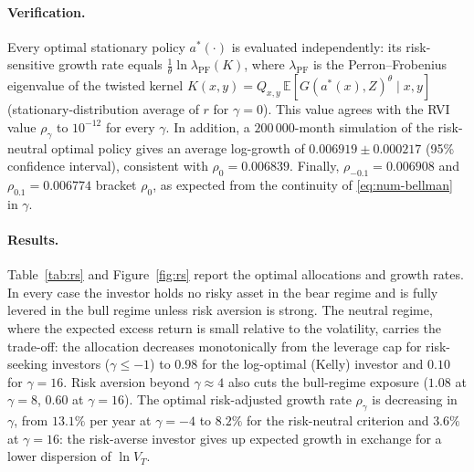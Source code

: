 \documentclass[11pt,a4paper]{article}
\newcommand{\E}{\mathbb{E}}
\begin{document}
\paragraph{Verification.} Every optimal stationary policy $a^*(\cdot)$ is evaluated independently: its risk-sensitive growth rate equals $\frac1\theta\ln\lambda_{\mathrm{PF}}(K)$, where $\lambda_{\mathrm{PF}}$ is the Perron--Frobenius eigenvalue of the twisted kernel $K(x,y)=Q_{x,y}\,\E[G(a^*(x),Z)^{\theta}\mid x,y]$ (stationary-distribution average of $r$ for $\gamma=0$). This value agrees with the RVI value $\rho_\gamma$ to $10^{-12}$ for every $\gamma$. In addition, a $200\,000$-month simulation of the risk-neutral optimal policy gives an average log-growth of $0.006919\pm0.000217$ (95\% confidence interval), consistent with $\rho_0=0.006839$. Finally, $\rho_{-0.1}=0.006908$ and $\rho_{0.1}=0.006774$ bracket $\rho_0$, as expected from the continuity of \eqref{eq:num-bellman} in $\gamma$.

\paragraph{Results.} Table~\ref{tab:rs} and Figure~\ref{fig:rs} report the optimal allocations and growth rates. In every case the investor holds no risky asset in the bear regime and is fully levered in the bull regime unless risk aversion is strong. The neutral regime, where the expected excess return is small relative to the volatility, carries the trade-off: the allocation decreases monotonically from the leverage cap for risk-seeking investors ($\gamma\le-1$) to $0.98$ for the log-optimal (Kelly) investor and $0.10$ for $\gamma=16$. Risk aversion beyond $\gamma\approx4$ also cuts the bull-regime exposure ($1.08$ at $\gamma=8$, $0.60$ at $\gamma=16$). The optimal risk-adjusted growth rate $\rho_\gamma$ is decreasing in $\gamma$, from $13.1\%$ per year at $\gamma=-4$ to $8.2\%$ for the risk-neutral criterion and $3.6\%$ at $\gamma=16$: the risk-averse investor gives up expected growth in exchange for a lower dispersion of $\ln V_T$.
\end{document}
